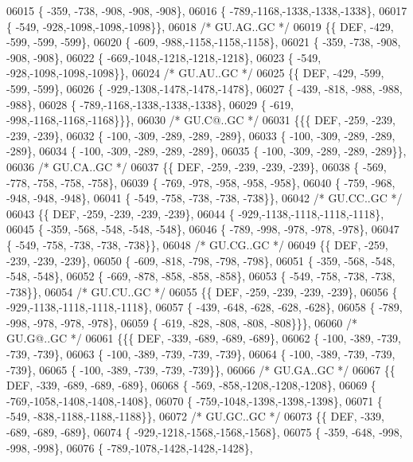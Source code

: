 \begin{DoxyCode}
06015 \{ -359, -738, -908, -908, -908\},
06016 \{ -789,-1168,-1338,-1338,-1338\},
06017 \{ -549, -928,-1098,-1098,-1098\}\},
06018 \textcolor{comment}{/* GU.AG..GC */}
06019 \{\{  DEF, -429, -599, -599, -599\},
06020 \{ -609, -988,-1158,-1158,-1158\},
06021 \{ -359, -738, -908, -908, -908\},
06022 \{ -669,-1048,-1218,-1218,-1218\},
06023 \{ -549, -928,-1098,-1098,-1098\}\},
06024 \textcolor{comment}{/* GU.AU..GC */}
06025 \{\{  DEF, -429, -599, -599, -599\},
06026 \{ -929,-1308,-1478,-1478,-1478\},
06027 \{ -439, -818, -988, -988, -988\},
06028 \{ -789,-1168,-1338,-1338,-1338\},
06029 \{ -619, -998,-1168,-1168,-1168\}\}\},
06030 \textcolor{comment}{/* GU.C@..GC */}
06031 \{\{\{  DEF, -259, -239, -239, -239\},
06032 \{ -100, -309, -289, -289, -289\},
06033 \{ -100, -309, -289, -289, -289\},
06034 \{ -100, -309, -289, -289, -289\},
06035 \{ -100, -309, -289, -289, -289\}\},
06036 \textcolor{comment}{/* GU.CA..GC */}
06037 \{\{  DEF, -259, -239, -239, -239\},
06038 \{ -569, -778, -758, -758, -758\},
06039 \{ -769, -978, -958, -958, -958\},
06040 \{ -759, -968, -948, -948, -948\},
06041 \{ -549, -758, -738, -738, -738\}\},
06042 \textcolor{comment}{/* GU.CC..GC */}
06043 \{\{  DEF, -259, -239, -239, -239\},
06044 \{ -929,-1138,-1118,-1118,-1118\},
06045 \{ -359, -568, -548, -548, -548\},
06046 \{ -789, -998, -978, -978, -978\},
06047 \{ -549, -758, -738, -738, -738\}\},
06048 \textcolor{comment}{/* GU.CG..GC */}
06049 \{\{  DEF, -259, -239, -239, -239\},
06050 \{ -609, -818, -798, -798, -798\},
06051 \{ -359, -568, -548, -548, -548\},
06052 \{ -669, -878, -858, -858, -858\},
06053 \{ -549, -758, -738, -738, -738\}\},
06054 \textcolor{comment}{/* GU.CU..GC */}
06055 \{\{  DEF, -259, -239, -239, -239\},
06056 \{ -929,-1138,-1118,-1118,-1118\},
06057 \{ -439, -648, -628, -628, -628\},
06058 \{ -789, -998, -978, -978, -978\},
06059 \{ -619, -828, -808, -808, -808\}\}\},
06060 \textcolor{comment}{/* GU.G@..GC */}
06061 \{\{\{  DEF, -339, -689, -689, -689\},
06062 \{ -100, -389, -739, -739, -739\},
06063 \{ -100, -389, -739, -739, -739\},
06064 \{ -100, -389, -739, -739, -739\},
06065 \{ -100, -389, -739, -739, -739\}\},
06066 \textcolor{comment}{/* GU.GA..GC */}
06067 \{\{  DEF, -339, -689, -689, -689\},
06068 \{ -569, -858,-1208,-1208,-1208\},
06069 \{ -769,-1058,-1408,-1408,-1408\},
06070 \{ -759,-1048,-1398,-1398,-1398\},
06071 \{ -549, -838,-1188,-1188,-1188\}\},
06072 \textcolor{comment}{/* GU.GC..GC */}
06073 \{\{  DEF, -339, -689, -689, -689\},
06074 \{ -929,-1218,-1568,-1568,-1568\},
06075 \{ -359, -648, -998, -998, -998\},
06076 \{ -789,-1078,-1428,-1428,-1428\},

\end{DoxyCode}
